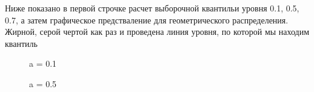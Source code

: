 \documentclass[a4paper,12pt, oneside]{book}
\begin{document}
	 Ниже показано в первой строчке расчет выборочной квантильи уровня 0.1, 0.5, 0.7, а затем графическое предстваление для геометрического распределения. Жирной, серой чертой как раз и проведена линия уровня, по которой мы находим квантиль
	 
\begin{figure}[h!]
	\begin{center}
		\begin{minipage}[h]{0.47\linewidth}
			 a = 0.1 \\
		\end{minipage}
		\hfill
		\begin{minipage}[h]{0.47\linewidth}
			 a = 0.5 \\
		\end{minipage}

\end{center}
\end{figure}
\end{document}

